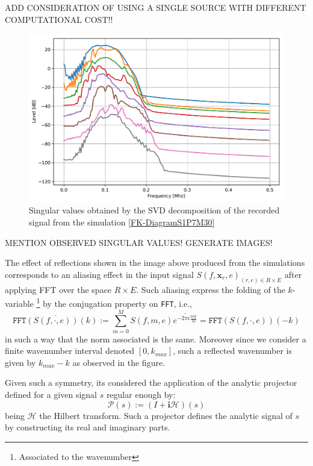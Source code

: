 ADD CONSIDERATION OF USING A SINGLE SOURCE WITH DIFFERENT COMPUTATIONAL COST!!
\begin{figure}[!h]
	\centering
	\includegraphics[scale=.5]{images/TimeSingSous/2DTime_P7Elastic30_SV.pdf}
	\caption{Singular values obtained by the SVD decomposition of the recorded signal from the simulation \ref{FK-DiagramS1P7M30}}
	\label{SVD-S1P7M30}
\end{figure}

MENTION OBSERVED SINGULAR VALUES! GENERATE IMAGES!

The effect of reflections shown in the image above produced from the simulations corresponds to an aliasing effect in the input signal $S(f, \mathbf{x}_r, e)_{(r,e) \in R\times E}$ after applying FFT over the space $R \times E$. Such aliasing express the folding of the $k$-variable \footnote{Associated to the wavenumber} by the conjugation property on \texttt{FFT}, i.e., 
\begin{equation*}
    \overline{\texttt{FFT}(S(f, \cdot, e))(k)} := \sum_{m=0}^M S(f, m, e) \overline{e^{-2 \pi i \frac{m k}{M}}} = \texttt{FFT}(S(f, \cdot, e))(-k)
\end{equation*}
in such a way that the norm associated is the same. Moreover since we consider a finite wavenumber interval denoted $[0, k_{max}]$, such a reflected wavenumber is given by $k_{max}-k$ as observed in the figure.

Given such a symmetry, its considered the application of the analytic projector defined for a given signal $s$ regular enough by:
\begin{equation*}
    \mathcal{P}(s) := (I + \mathbf{i}\mathcal{H})(s)
\end{equation*}
being $\mathcal{H}$ the Hilbert transform. Such a projector defines the analytic signal of $s$ by constructing its real and imaginary parts.

